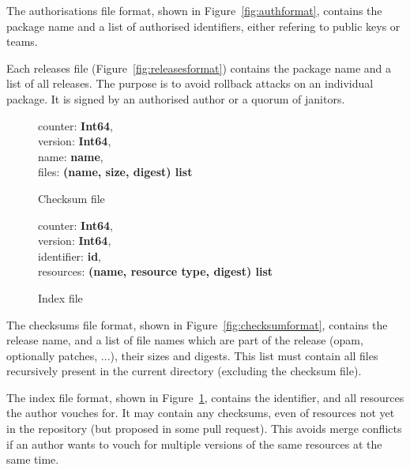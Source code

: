 \documentclass[nocopyrightspace]{sigplanconf}
\newcommand{\TODO}[1]{\textbf{[TODO: #1]}}
\begin{document}
The authorisations file format, shown in Figure~\ref{fig:authformat}, contains the package name and a list of authorised identifiers, either refering to public keys or teams.

Each releases file (Figure~\ref{fig:releasesformat}) contains the package name and a list of all releases.
The purpose is to avoid rollback attacks on an individual package.
It is signed by an authorised author or a quorum of janitors.

\begin{figure}[h]
  \begin{minipage}{\hsize}
    \begin{minipage}{.4 \hsize}
counter: \textbf{Int64},\\
version: \textbf{Int64},\\
name: \textbf{name},\\
files: \textbf{(name, size, digest) list}
 \caption{\label{fig:checksumformat} Checksum file}
    \end{minipage}
    \hspace*{.5cm}
    \begin{minipage}{.4 \hsize}
counter: \textbf{Int64},\\
version: \textbf{Int64},\\
identifier: \textbf{id},\\
resources: \textbf{(name, resource type, digest) list}
 \caption{\label{fig:janindexformat} Index file}
    \end{minipage}
  \end{minipage}
\end{figure}

The checksums file format, shown in Figure~\ref{fig:checksumformat}, contains the release name, and a list of file names which are part of the release (opam, optionally patches, ...), their sizes and digests.
This list must contain all files recursively present in the current directory (excluding the checksum file).

The index file format, shown in Figure~\ref{fig:janindexformat}, contains the identifier, and all resources the author vouches for.
It may contain any checksums, even of resources not yet in the repository (but proposed in some pull request).
This avoids merge conflicts if an author wants to vouch for multiple versions of the same resources at the same time.
\end{document}
